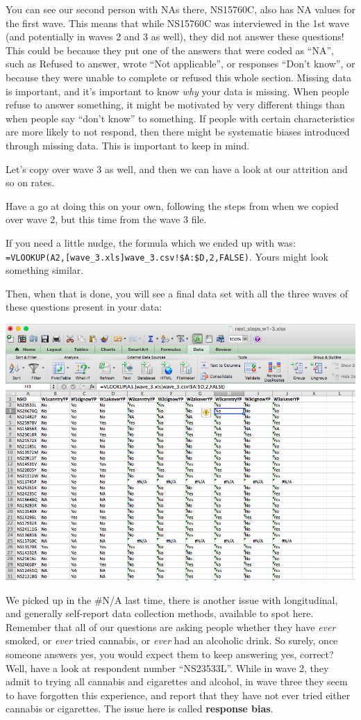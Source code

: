 \documentclass[
]{book}
\begin{document}
You can see our second person with NAs there, NS15760C, also has NA values for the first wave. This means that while NS15760C was interviewed in the 1st wave (and potentially in waves 2 and 3 as well), they did not answer these questions! This could be because they put one of the answers that were coded as ``NA'', such as Refused to answer, wrote ``Not applicable'', or responses ``Don't know'', or because they were unable to complete or refused this whole section. Missing data is important, and it's important to know \emph{why} your data is missing. When people refuse to answer something, it might be motivated by very different things than when people say ``don't know'' to something. If people with certain characteristics are more likely to not respond, then there might be systematic biases introduced through missing data. This is important to keep in mind.

Let's copy over wave 3 as well, and then we can have a look at our attrition and so on rates.

Have a go at doing this on your own, following the steps from when we copied over wave 2, but this time from the wave 3 file.

If you need a little nudge, the formula which we ended up with was: \texttt{=VLOOKUP(A2,{[}wave\_3.xls{]}wave\_3.csv!\$A:\$D,2,FALSE)}. Yours might look something similar.

Then, when that is done, you will see a final data set with all the three waves of these questions present in your data:

\includegraphics{imgs/merged_data_final.png}

We picked up in the \#N/A last time, there is another issue with longitudinal, and generally self-report data collection methods, available to spot here. Remember that all of our questions are asking people whether they have \emph{ever} smoked, or \emph{ever} tried cannabis, or \emph{ever} had an alcoholic drink. So surely, once someone answers yes, you would expect them to keep answering yes, correct? Well, have a look at respondent number ``NS23533L''. While in wave 2, they admit to trying all cannabis and cigarettes and alcohol, in wave three they seem to have forgotten this experience, and report that they have not ever tried either cannabis or cigarettes. The issue here is called \textbf{response bias}.
\end{document}
